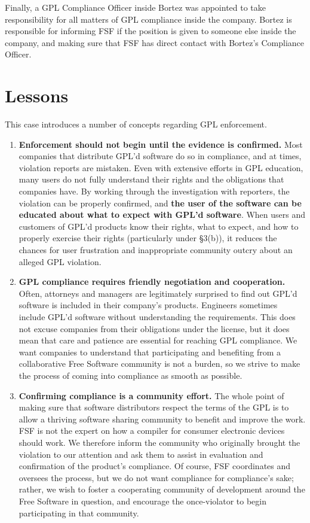 Finally, a GPL Compliance Officer inside Bortez was appointed to take
responsibility for all matters of GPL compliance inside the company.
Bortez is responsible for informing FSF if the position is given to
someone else inside the company, and making sure that FSF has direct
contact with Bortez's Compliance Officer.

\section{Lessons}

This case introduces a number of concepts regarding GPL enforcement.

\begin{enumerate}

\item {\bf Enforcement should not begin until the evidence is confirmed.}
  Most companies that distribute GPL'd software do so in compliance, and at
  times, violation reports are mistaken. Even with extensive efforts in
  GPL education, many users do not fully understand their rights and the
  obligations that companies have. By working through the investigation
  with reporters, the violation can be properly confirmed, and {\bf the
    user of the software can be educated about what to expect with GPL'd
    software}. When users and customers of GPL'd products know their
  rights, what to expect, and how to properly exercise their rights
  (particularly under \S 3(b)), it reduces the chances for user
  frustration and inappropriate community outcry about an alleged GPL
  violation.

\item {\bf GPL compliance requires friendly negotiation and cooperation.}
  Often, attorneys and managers are legitimately surprised to find out
  GPL'd software is included in their company's products. Engineers
  sometimes include GPL'd software without understanding the requirements.
  This does not excuse companies from their obligations under the license,
  but it does mean that care and patience are essential for reaching GPL
  compliance. We want companies to understand that participating and
  benefiting from a collaborative Free Software community is not a burden,
  so we strive to make the process of coming into compliance as smooth as
  possible.

\item {\bf Confirming compliance is a community effort.}  The whole point
  of making sure that software distributors respect the terms of the GPL is to
  allow a thriving software sharing community to benefit and improve the
  work. FSF is not the expert on how a compiler for consumer electronic
  devices should work. We therefore inform the community who originally
  brought the violation to our attention and ask them to assist in
  evaluation and confirmation of the product's compliance. Of course, FSF
  coordinates and oversees the process, but we do not want compliance for
  compliance's sake; rather, we wish to foster a cooperating community of
  development around the Free Software in question, and encourage the
  once-violator to begin participating in that community.


\end{enumerate}
